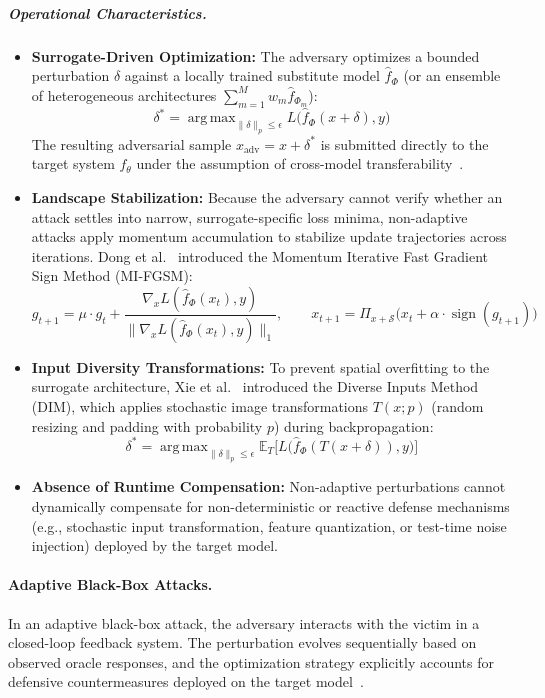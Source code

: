\documentclass[12pt]{article}
\DeclareMathOperator{\sign}{sign}
\DeclareMathOperator*{\argmax}{arg\,max}
\begin{document}
\subparagraph{Operational Characteristics.}
\begin{itemize}
  \item \textbf{Surrogate-Driven Optimization:} The adversary optimizes a bounded perturbation $\delta$ against a locally trained substitute model $\hat{f}_\Phi$ (or an ensemble of heterogeneous architectures $\sum_{m=1}^{M} w_m \hat{f}_{\Phi_m}$):
  \begin{equation}
    \delta^{*} = \argmax_{\lVert\delta\rVert_p \le \epsilon} L\big(\hat{f}_\Phi(x+\delta), y\big)
  \end{equation}
  The resulting adversarial sample $x_{\mathrm{adv}} = x + \delta^{*}$ is submitted directly to the target system $f_\theta$ under the assumption of cross-model transferability~\cite{papernot2017,dong2018}.
  \item \textbf{Landscape Stabilization:} Because the adversary cannot verify whether an attack settles into narrow, surrogate-specific loss minima, non-adaptive attacks apply momentum accumulation to stabilize update trajectories across iterations. Dong et al.~\cite{dong2018} introduced the Momentum Iterative Fast Gradient Sign Method (MI-FGSM):
  \begin{equation}
    g_{t+1} = \mu \cdot g_t + \frac{\nabla_x L(\hat{f}_\Phi(x_t), y)}{\lVert \nabla_x L(\hat{f}_\Phi(x_t), y) \rVert_1}, \qquad x_{t+1} = \Pi_{x+\mathcal{S}}\big(x_t + \alpha \cdot \sign(g_{t+1})\big)
  \end{equation}
  \item \textbf{Input Diversity Transformations:} To prevent spatial overfitting to the surrogate architecture, Xie et al.~\cite{xie2019} introduced the Diverse Inputs Method (DIM), which applies stochastic image transformations $T(x; p)$ (random resizing and padding with probability $p$) during backpropagation:
  \begin{equation}
    \delta^{*} = \argmax_{\lVert\delta\rVert_p \le \epsilon} \mathbb{E}_T\Big[L\big(\hat{f}_\Phi(T(x+\delta)), y\big)\Big]
  \end{equation}
  \item \textbf{Absence of Runtime Compensation:} Non-adaptive perturbations cannot dynamically compensate for non-deterministic or reactive defense mechanisms (e.g., stochastic input transformation, feature quantization, or test-time noise injection) deployed by the target model.
\end{itemize}

\paragraph{Adaptive Black-Box Attacks.} In an adaptive black-box attack, the adversary interacts with the victim in a closed-loop feedback system. The perturbation evolves sequentially based on observed oracle responses, and the optimization strategy explicitly accounts for defensive countermeasures deployed on the target model~\cite{carlini2019,athalye2018}.
\end{document}
